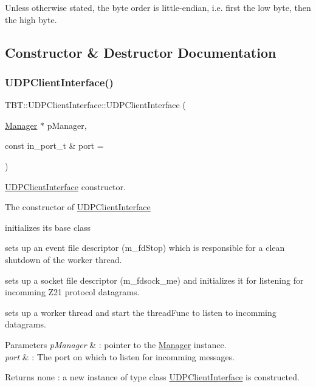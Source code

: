 Unless otherwise stated, the byte order is little-\/endian, i.\+e. first the low byte, then the high byte. 

\subsection{Constructor \& Destructor Documentation}
\mbox{\label{classTBT_1_1UDPClientInterface_ad03356f6abf16596c181851e9fcaf7a9_ad03356f6abf16596c181851e9fcaf7a9}} 
\subsubsection{\texorpdfstring{U\+D\+P\+Client\+Interface()}{UDPClientInterface()}}
{\footnotesize\ttfamily T\+B\+T\+::\+U\+D\+P\+Client\+Interface\+::\+U\+D\+P\+Client\+Interface (\begin{DoxyParamCaption}\item[{\hyperlink{classTBT_1_1Manager}{Manager} $\ast$}]{p\+Manager,  }\item[{const in\+\_\+port\+\_\+t \&}]{port = {} }\end{DoxyParamCaption})}



\hyperlink{classTBT_1_1UDPClientInterface}{U\+D\+P\+Client\+Interface} constructor. 

The constructor of \hyperlink{classTBT_1_1UDPClientInterface}{U\+D\+P\+Client\+Interface}
\begin{DoxyItemize}
\item initializes its base class
\item sets up an event file descriptor (m\+\_\+fd\+Stop) which is responsible for a clean shutdown of the worker thread.
\item sets up a socket file descriptor (m\+\_\+fdsock\+\_\+me) and initializes it for listening for incomming Z21 protocol datagrams.
\item sets up a worker thread and start the thread\+Func to listen to incomming datagrams.
\end{DoxyItemize}


\begin{DoxyParams}{Parameters}
{\em p\+Manager} & \+: pointer to the \hyperlink{classTBT_1_1Manager}{Manager} instance. \\
\hline
{\em port} & \+: The port on which to listen for incomming messages.\\
\hline
\end{DoxyParams}
\begin{DoxyReturn}{Returns}
none \+: a new instance of type class \hyperlink{classTBT_1_1UDPClientInterface}{U\+D\+P\+Client\+Interface} is constructed. 
\end{DoxyReturn}


